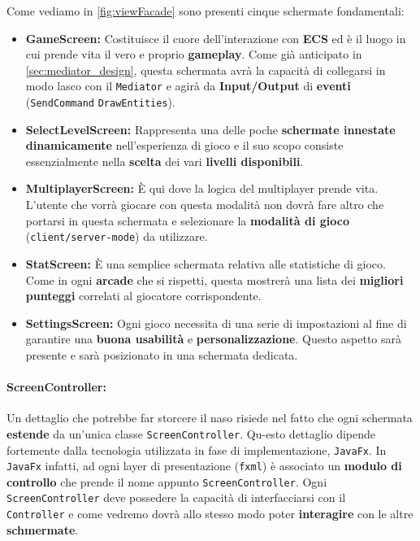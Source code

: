 Come vediamo in \ref{fig:viewFacade} sono presenti cinque schermate fondamentali:
\begin{itemize}
	\item{\textbf{GameScreen:}}
	Costituisce il cuore dell'interazione con \textbf{ECS} ed è il luogo in cui prende vita il vero e proprio \textbf{gameplay}. Come già anticipato in \ref{sec:mediator_design}, questa schermata avrà la capacità di collegarsi in modo lasco con il \texttt{Mediator} e agirà da \textbf{Input/Output} di \textbf{eventi} (\texttt{SendCommand} \texttt{DrawEntities}).
	\item{\textbf{SelectLevelScreen:}}
	Rappresenta una delle poche \textbf{schermate innestate dinamicamente} nell'esperienza di gioco e il suo scopo consiste essenzialmente nella \textbf{scelta} dei vari \textbf{livelli disponibili}. 
	\item{\textbf{MultiplayerScreen:}}
	È qui dove la logica del multiplayer prende vita. L'utente che vorrà giocare con questa modalità non dovrà fare altro che portarsi in questa schermata e selezionare la \textbf{modalità di gioco} \\ (\texttt{client/server-mode}) da utilizzare.
	\item{\textbf{StatScreen:}}
	È una semplice schermata relativa alle statistiche di gioco. Come in ogni \textbf{arcade} che si rispetti, questa mostrerà una lista dei \textbf{migliori punteggi} correlati al giocatore corrispondente.
	\item{\textbf{SettingsScreen:}}
	Ogni gioco necessita di una serie di impostazioni al fine di garantire una \textbf{buona usabilità} e \textbf{personalizzazione}. Questo aspetto sarà presente e sarà posizionato in una schermata dedicata. 
\end{itemize}

\paragraph{ScreenController:}
Un dettaglio che potrebbe far storcere il naso risiede nel fatto che ogni schermata \textbf{estende} da un'unica classe \texttt{ScreenController}. Qu-esto dettaglio dipende fortemente dalla tecnologia utilizzata in fase di implementazione, \texttt{JavaFx}. In \texttt{JavaFx} infatti, ad ogni layer di presentazione (\texttt{fxml}) è associato un \textbf{modulo di controllo} che prende il nome appunto \texttt{ScreenController}. Ogni \texttt{ScreenController} deve possedere la capacità di interfacciarsi con il \\ \texttt{Controller} e come vedremo dovrà allo stesso modo poter \textbf{interagire} con le altre \textbf{schmermate}.

